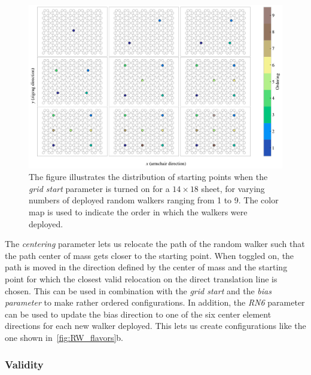 \begin{figure}[h]
  \centering
  \includegraphics[width=\linewidth]{figures/system/grid_start.pdf}
  \caption{The figure illustrates the distribution of starting points when the \textit{grid start} parameter is turned on for a $14\times 18$ sheet, for varying numbers of deployed random walkers ranging from 1 to 9. The color map is used to indicate the order in which the walkers were deployed.}
  \label{fig:grid_start}
\end{figure}


The \textit{centering} parameter lets us relocate the path of the random walker
such that the path center of mass gets closer to the starting point. When
toggled on, the path is moved in the direction defined by the center of mass and
the starting point for which the closest valid relocation on the direct
translation line is chosen. This can be used in combination with the
\textit{grid start} and the \textit{bias parameter} to make rather ordered
configurations. In addition, the \textit{RN6} parameter can be used to update
the bias direction to one of the six center element directions for each new
walker deployed. This lets us create configurations like the one shown
in~\cref{fig:RW_flavors}\textcolor{red!50!black}{b}. 


\subsubsection{Validity}

